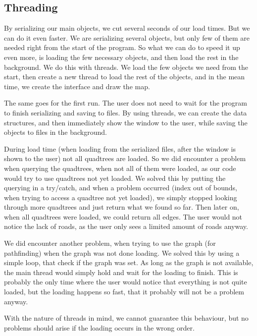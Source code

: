 \subsection{Threading}
By serializing our main objects, we cut several seconds of our load times. But
we can do it even faster. We are serializing several objects, but only few of
them are needed right from the start of the program. So what we can do to speed
it up even more, is loading the few necessary objects, and then load the rest in
the background. We do this with threads. We load the few objects we need from
the start, then create a new thread to load the rest of the objects, and in the
mean time, we create the interface and draw the map.

The same goes for the first run. The user does not need to wait for the program
to finish serializing and saving to files. By using threads, we can create the
data structures, and then immediately show the window to the user, while saving
the objects to files in the background.

During load time (when loading from the serialized files, after the window is
shown to the user) not all quadtrees are loaded. So we did encounter a problem
when querying the quadtrees, when not all of them were loaded, as our code
would try to use quadtrees not yet loaded. We solved this by putting the
querying in a try/catch, and when a problem occurred (index out of bounds, when
trying to access a quadtree not yet loaded), we simply stopped looking through
more quadtrees and just return what we found so far. Then later on, when all
quadtrees were loaded, we could return all edges. The user would not notice the
lack of roads, as the user only sees a limited amount of roads anyway.

We did encounter another problem, when trying to use the graph (for pathfinding)
when the graph was not done loading. We solved this by using a simple loop, that
check if the graph was set. As long as the graph is not available, the main
thread would simply hold and wait for the loading to finish. This is probably
the only time where the user would notice that everything is not quite loaded,
but the loading happens so fast, that it probably will not be a problem anyway.

With the nature of threads in mind, we cannot guarantee this behaviour, but no
problems should arise if the loading occurs in the wrong order.
